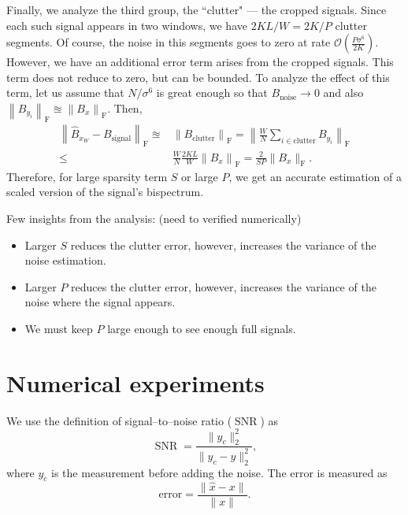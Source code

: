 \documentclass[journal]{IEEEtran}
\numberwithin{equation}{section}
\numberwithin{figure}{section}
\theoremstyle{plain}
\theoremstyle{definition}
\theoremstyle{remark}
\theoremstyle{plain}
\theoremstyle{remark}
\theoremstyle{plain}
\theoremstyle{plain}
\newcommand{\order}[1]{\mathcal{O}\left({#1} \right)}
\newcommand{\SNR}{\operatorname{SNR}}
\begin{document}
Finally, we analyze the third group, the  ``clutter" --- the cropped signals. Since each such signal appears in two windows,
we have $2KL/W = 2K/P$ clutter segments. Of course, the noise in this segments goes to zero
at rate $\order{\frac{P\sigma^6}{2K}}$. However, we have an additional error term arises from  the cropped signals. This term does not reduce to zero, but can be bounded. 
 To analyze the effect of this term, let us assume that $N/\sigma^6$ is great enough so that $B_\textrm{noise}\to 0$ and also $\left\|B_{y_i}\right\|_{\textrm{F}} \approxeq \left\|B_x\right\|_{\textrm{F}}$. Then,
\begin{equation}
\begin{split}
\left\| \hat{B}_{x_W} - B_\textrm{signal}\right\|_{\textrm{F}} \approxeq&  \left\|B_\textrm{clutter}\right\|_{\textrm{F}}
= \left\|\frac{W}{N}\sum_{i\in\textrm{clutter}}B_{y_i}\right\|_{\textrm{F}}
\\ \leq & 
\frac{W}{N}\frac{2KL}{W}\left\|B_x\right\|_{\textrm{F}} = \frac{2}{SP}
\|B_x\|_{\textrm{F}}.
\end{split}
\end{equation}
Therefore, for large sparsity term $S$ or large $P$, we get an accurate estimation of a scaled version of the signal's bispectrum. 

Few insights from the analysis: (need to verified numerically)
\begin{itemize}
	\item Larger $S$ reduces the clutter error, however, increases the variance of the noise estimation.
	\item Larger $P$ reduces the clutter error, however, increases the variance of the noise  where the signal appears.
	\item We must keep $P$ large enough to see enough full signals.    
\end{itemize} 


\section{Numerical experiments} \label{sec:experiments}

We use the definition of signal--to--noise ratio ($\SNR$) as
\begin{equation}
\SNR = \frac{\|y_c\|_2^2}{\|y_c-y\|_2^2},
\end{equation}
where $y_c$ is the measurement before adding the noise. The error is measured as 
\begin{equation}
\textrm{error}  = \frac{\|\hat{x}-x\|}{\|x\|}.
\end{equation}
\end{document}
